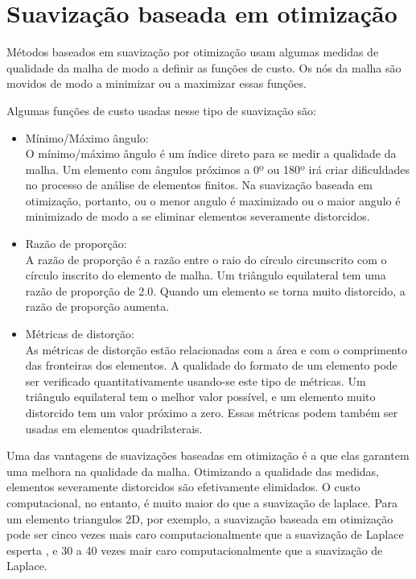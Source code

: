 \section{Suavização baseada em otimização}

Métodos baseados em suavização por otimização usam algumas medidas de qualidade da malha de modo a definir as funções de custo. Os nós da malha são movidos de modo a minimizar ou a maximizar essas funções.

Algumas funções de custo usadas nesse tipo de suavização são:

\begin{itemize}
    \item Mínimo/Máximo ângulo:\\
    O mínimo/máximo ângulo é um índice direto para se medir a qualidade da malha. Um elemento com ângulos próximos a 0º ou 180º irá criar dificuldades no processo de análise de elementos finitos. Na suavização baseada em otimização, portanto, ou o menor angulo é maximizado ou o maior angulo é minimizado de modo a se eliminar elementos severamente distorcidos.
    \item Razão de proporção:\\
    A razão de proporção é a razão entre o raio do círculo circunscrito com o círculo inscrito do elemento de malha. Um triângulo equilateral tem uma razão de proporção de 2.0. Quando um elemento se torna muito distorcido, a razão de proporção aumenta.
    \item Métricas de distorção:\\
    As métricas de distorção estão relacionadas com a área e com o comprimento das fronteiras dos elementos. A qualidade do formato de um elemento pode ser verificado quantitativamente usando-se este tipo de métricas. Um triângulo equilateral tem o melhor valor possível, e um elemento muito distorcido tem um valor próximo a zero. Essas métricas podem também ser usadas em elementos quadrilaterais.
\end{itemize}

Uma das vantagens de suavizações baseadas em otimização é a que elas garantem uma melhora na qualidade da malha. Otimizando a qualidade das medidas, elementos severamente distorcidos são efetivamente elimidados. O custo computacional, no entanto, é muito maior do que a suavização de laplace. Para um elemento triangulos 2D, por exemplo, a suavização baseada em otimização pode ser cinco vezes mais caro computacionalmente que a suavização de Laplace esperta \cite{Freitag1997OnCL}, e 30 a 40 vezes mair caro computacionalmente que a suavização de Laplace.

